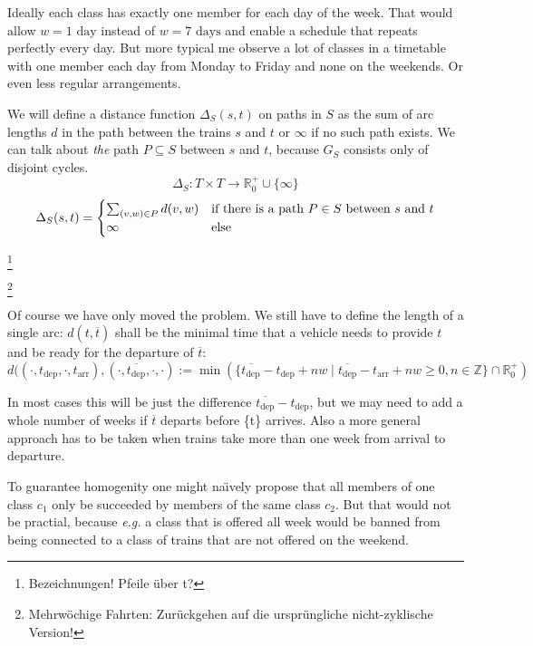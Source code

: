 \documentclass[a4paper]{amsart} %
\def\eg{\emph{e.g.}}
\def\naively{na\"{\i}vely}	%
\newcommand{\ol}[1]{\overline{#1}}
\newcommand{\todo}[1]{\footnote{#1}}
\begin{document}
Ideally each class has exactly one member for each day of the week.
That would allow \(w = 1 \textrm{ day}\) instead of \(w = 7 \textrm{ days}\)
and enable a schedule that repeats perfectly every day.  But more
typical me observe a lot of classes in a timetable with one member
each day from Monday to Friday and none on the weekends.  Or even less
regular arrangements.

We will define a distance function \(\Delta_S (s,t)\) on paths in
\(S\) as the sum of arc lengths \(d\) in the path between the
trains \(s\) and \(t\) or \(\infty\) if no such path exists.  We can
talk about \emph{the} path \(P \subseteq S\) between \(s\) and \(t\),
because \(G_S\) consists only of disjoint cycles.
\[\Delta_{S}\colon T \times T \to \mathbb{R}^+_0 \cup \{\infty\}\]
\begin{equation}
\label{defDelta}
\Delta_S (s,t) = \begin{cases}
\sum_{(v,w)\in P} d(v,w) & \textrm{if there is a path \( P \in S\) between \(s\) and \(t\)}\\
\infty & \textrm{else}
\end{cases}
\end{equation}

\todo{Bezeichnungen!  Pfeile über t?}

\todo{Mehrwöchige Fahrten:  Zurückgehen auf die ursprüngliche nicht-zyklische Version!}

Of course we have only moved the problem.  We still have to define the length of a single arc:  \(d(t, \ol{t})\) shall be the minimal time that a vehicle needs to provide \(t\) and be ready for the departure of \(\ol{t}\):
\[
d ((\cdot, t_{\textrm{dep}}, \cdot, t_{\textrm{arr}}), (\cdot, \ol{t_{\textrm{dep}}},\cdot, \cdot)  :=
\min (\{\ol{t_{\textrm{dep}}} - t_{\textrm{dep}} + n w \mid \ol{t_{\textrm{dep}}} - t_{\textrm{arr}} + nw \geq 0, n \in \mathbb{Z}\} \cap \mathbb{R}^+_0)
\]

In most cases this will be just the difference \(\ol{t_{\textrm{dep}}}
- t_{\textrm{dep}}\), but we may need to add a whole number of weeks
if \(\ol{t}\) departs before \{t\} arrives.  Also a more general approach
has to be taken when trains take more than one week from arrival to
departure.

To guarantee homogenity one might \naively{} propose that all members
of one class \(c_1\) only be succeeded by members of the same class
\(c_2\).  But that would not be practial, because \eg{} a class that is
offered all week would be banned from being connected to a class of trains that
are not offered on the weekend.
\end{document}
